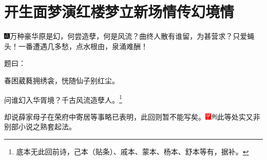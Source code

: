 

\chapter{开生面梦演红楼梦\hspace{.5em}立新场情传幻境情}
{\includegraphics[width=3mm]{../Images/00005}\kaishu 万种豪华原是幻，何尝造孽，何是风流？曲终人散有谁留，为甚营求？只爱蝇头！一番遭遇几多愁，点水根由，泉涌难酬！}

题曰：

春困葳蕤拥绣衾，恍随仙子别红尘。

问谁幻入华胥境？千古风流造孽人。\footnote{底本无此回前诗，己本（贴条）、戚本、蒙本、杨本、舒本等有，据补。}

却说薛家母子在荣府中寄居等事略已表明，此回则暂不能写矣。{\includegraphics[width=3mm]{../Images/00002}\includegraphics[width=3mm]{../Images/00011}\footnotesize \kaishu 此等处实又非别部小说之熟套起法。}

